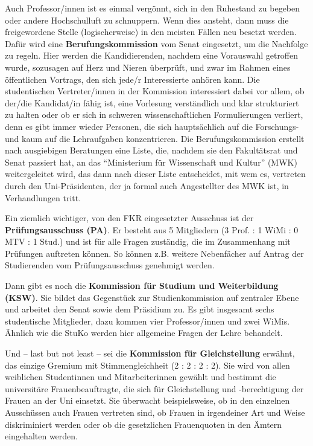 Auch Professor/innen ist es einmal vergönnt, sich in den Ruhestand zu begeben oder andere Hochschulluft zu schnuppern. Wenn dies ansteht, dann muss die freigewordene Stelle (logischerweise) in den meisten Fällen neu besetzt werden. Dafür wird eine \textbf{Berufungskommission} vom Senat eingesetzt, um die Nachfolge zu regeln. Hier werden die Kandidierenden, nachdem eine Vorauswahl getroffen wurde, sozusagen auf Herz und Nieren überprüft, und zwar im Rahmen eines öffentlichen Vortrags, den sich jede/r Interessierte anhören kann. Die studentischen Vertreter/innen in der Kommission interessiert dabei vor allem, ob der/die Kandidat/in fähig ist, eine Vorlesung verständlich und klar strukturiert zu halten oder ob er sich in schweren wissenschaftlichen Formulierungen verliert, denn es gibt immer wieder Personen, die sich hauptsächlich auf die Forschungs- und kaum auf die Lehraufgaben konzentrieren. Die Berufungskommission erstellt nach ausgiebigen Beratungen eine Liste, die, nachdem sie den Fakultätsrat und Senat passiert hat, an das \enquote{Ministerium für Wissenschaft und Kultur} (MWK) weitergeleitet wird, das dann nach dieser Liste entscheidet, mit wem es, vertreten durch den Uni-Präsidenten, der ja formal auch Angestellter des MWK ist, in Verhandlungen tritt.

Ein ziemlich wichtiger, von den FKR eingesetzter Ausschuss ist der \textbf{Prüfungsausschuss (PA)}. Er besteht aus 5 Mitgliedern (3 Prof. : 1 WiMi : 0 MTV : 1 Stud.) und ist für alle Fragen zuständig, die im Zusammenhang mit Prüfungen auftreten können. So können z.B. weitere Nebenfächer auf Antrag der Studierenden vom Prüfungsausschuss genehmigt werden.

Dann gibt es noch die \textbf{Kommission für Studium und Weiterbildung (KSW)}. Sie bildet das Gegenstück zur Studienkommission auf zentraler Ebene und arbeitet den Senat sowie dem Präsidium zu. Es gibt insgesamt sechs studentische Mitglieder, dazu kommen vier Professor/innen und zwei WiMis. Ähnlich wie die StuKo werden hier allgemeine Fragen der Lehre behandelt.

Und -- last but not least -- sei die \textbf{Kommission für Gleichstellung} erwähnt, das einzige Gremium mit Stimmengleichheit (2 : 2 : 2 : 2). Sie wird von allen weiblichen Studentinnen und Mitarbeiterinnen gewählt und bestimmt die universitäre Frauenbeauftragte, die sich für Gleichstellung und -berechtigung der Frauen an der Uni einsetzt. Sie überwacht beispielsweise, ob in den einzelnen Ausschüssen auch Frauen vertreten sind, ob Frauen in
irgendeiner Art und Weise diskriminiert werden oder ob die gesetzlichen Frauenquoten in den Ämtern eingehalten werden.


